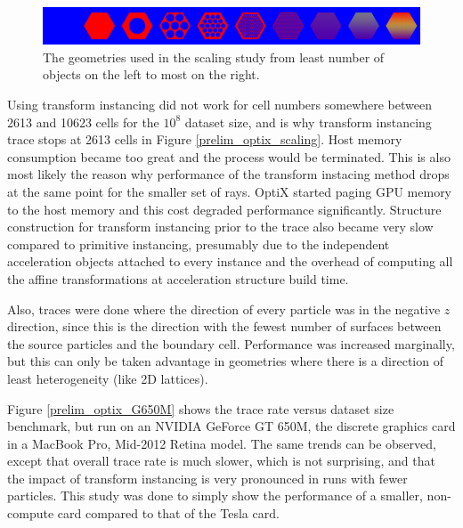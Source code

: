 \begin{figure}[h!] 
  \centering
    \includegraphics[width=1.0\textwidth]{graphics/prelim/prelim_scaling_geom.png}
     \caption{The geometries used in the scaling study from least number of objects on the left to most on the right. \label{prelim_scaling_geom} }
\end{figure}

Using transform instancing did not work for cell numbers somewhere between 2613 and 10623 cells for the $10^8$ dataset size, and is why transform instancing trace stops at 2613 cells in Figure \ref{prelim_optix_scaling}.   Host memory consumption became too great and the process would be terminated.  This is also most likely the reason why performance of the transform instacing method drops at the same point for the smaller set of rays.  OptiX started paging GPU memory to the host memory and this cost degraded performance significantly.  Structure construction for transform instancing prior to the trace also became very slow compared to primitive instancing, presumably due to the independent acceleration objects attached to every instance and the overhead of computing all the affine transformations at acceleration structure build time.

Also, traces were done where the direction of every particle was in the negative $z$ direction, since this is the direction with the fewest number of surfaces between the source particles and the boundary cell.  Performance was increased marginally, but this can only be taken advantage in geometries where there is a direction of least heterogeneity (like 2D lattices).

Figure \ref{prelim_optix_G650M} shows the trace rate versus dataset size benchmark, but run on an NVIDIA GeForce GT 650M, the discrete graphics card in a MacBook Pro, Mid-2012 Retina model.  The same trends can be observed, except that overall trace rate is much slower, which is not surprising, and that the impact of transform instancing is very pronounced in runs with fewer particles.  This study was done to simply show the performance of a smaller, non-compute card compared to that of the Tesla card.

